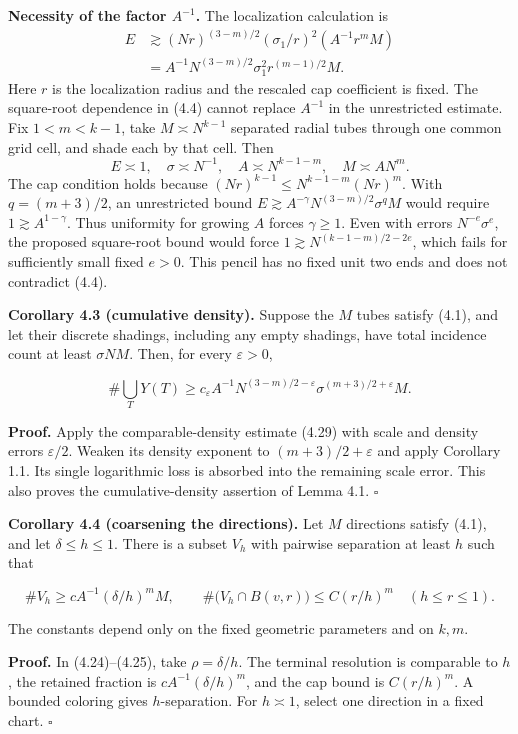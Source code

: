 \documentclass[
  11pt,
  a4paper,
]{article}
\begin{document}
\textbf{Necessity of the factor \(A^{-1}\).} The localization
calculation is \[\begin{aligned}
E&\gtrsim (Nr)^{(3-m)/2}(\sigma_1/r)^2
                (A^{-1}r^mM)\\
 &=A^{-1}N^{(3-m)/2}\sigma_1^2r^{(m-1)/2}M.
\end{aligned}\] Here \(r\) is the localization radius and the rescaled
cap coefficient is fixed. The square-root dependence in (4.4) cannot
replace \(A^{-1}\) in the unrestricted estimate. Fix \(1<m<k-1\), take
\(M\asymp N^{k-1}\) separated radial tubes through one common grid cell,
and shade each by that cell. Then
\[E\asymp1,\quad \sigma\asymp N^{-1},\quad
A\asymp N^{k-1-m},\quad M\asymp A N^m.\] The cap condition holds because
\((Nr)^{k-1}\le N^{k-1-m}(Nr)^m\). With \(q=(m+3)/2\), an unrestricted
bound \(E\gtrsim A^{-\gamma}N^{(3-m)/2}\sigma^qM\) would require
\(1\gtrsim A^{1-\gamma}\). Thus uniformity for growing \(A\) forces
\(\gamma\ge1\). Even with errors \(N^{-e}\sigma^e\), the proposed
square-root bound would force \(1\gtrsim N^{(k-1-m)/2-2e}\), which fails
for sufficiently small fixed \(e>0\). This pencil has no fixed unit two
ends and does not contradict (4.4).

\textbf{Corollary 4.3 (cumulative density).} Suppose the \(M\) tubes
satisfy (4.1), and let their discrete shadings, including any empty
shadings, have total incidence count at least \(\sigma NM\). Then, for
every \(\varepsilon>0\),

\[
 \#\bigcup_TY(T)
 \ge c_\varepsilon A^{-1}N^{(3-m)/2-\varepsilon}
       \sigma^{(m+3)/2+\varepsilon}M.
\]

\textbf{Proof.} Apply the comparable-density estimate (4.29) with scale
and density errors \(\varepsilon/2\). Weaken its density exponent to
\((m+3)/2+\varepsilon\) and apply Corollary 1.1. Its single logarithmic
loss is absorbed into the remaining scale error. This also proves the
cumulative-density assertion of Lemma 4.1. \(\square\)

\textbf{Corollary 4.4 (coarsening the directions).} Let \(M\) directions
satisfy (4.1), and let \(\delta\le h\le1\). There is a subset \(V_h\)
with pairwise separation at least \(h\) such that

\[
 \#V_h\ge cA^{-1}(\delta/h)^mM,
 \qquad
 \#\bigl(V_h\cap B(v,r)\bigr)\le C(r/h)^m
 \quad (h\le r\le1).
\tag{4.30}\label{eq:4.30}
\]

The constants depend only on the fixed geometric parameters and on
\(k,m\).

\textbf{Proof.} In (4.24)--(4.25), take \(\rho=\delta/h\). The terminal
resolution is comparable to \(h\), the retained fraction is
\(cA^{-1}(\delta/h)^m\), and the cap bound is \(C(r/h)^m\). A bounded
coloring gives \(h\)-separation. For \(h\asymp1\), select one direction
in a fixed chart. \(\square\)
\end{document}
